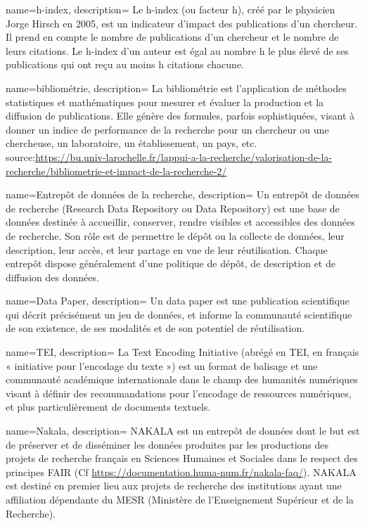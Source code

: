 {
    name=h-index,
    description={
    Le h-index (ou facteur h), créé par le physicien Jorge Hirsch en 2005, est un indicateur d’impact des publications d’un chercheur. Il prend en compte le nombre de publications d’un chercheur et le nombre de leurs citations. Le h-index d’un auteur est égal au nombre h le plus élevé de ses publications qui ont reçu au moins h citations chacune.
    }
}


{
    name=bibliométrie,
    description={
    La bibliométrie est l’application de méthodes statistiques et mathématiques pour mesurer et évaluer la production et la diffusion de publications. Elle génère des formules, parfois sophistiquées, visant à donner un indice de performance de la recherche pour un chercheur ou une chercheuse, un laboratoire, un établissement, un pays, etc.
    source:\url{https://bu.univ-larochelle.fr/lappui-a-la-recherche/valorisation-de-la-recherche/bibliometrie-et-impact-de-la-recherche-2/}
    }
}

{
    name=Entrepôt de données de la recherche,
    description={
    Un entrepôt de données de recherche (Research Data Repository ou Data Repository) est une base de données destinée à accueillir, conserver, rendre visibles et accessibles des données de recherche. Son rôle est de permettre le dépôt ou la collecte de données, leur description, leur accès, et leur partage en vue de leur réutilisation. Chaque entrepôt dispose généralement d’une politique de dépôt, de description et de diffusion des données. 
    }
}


{
    name=Data Paper,
    description={
    Un data paper est une publication scientifique qui décrit précisément un jeu de données, et informe la communauté scientifique de son existence, de ses modalités et de son potentiel de réutilisation.
    }
}

{
    name=TEI,
    description={
    La Text Encoding Initiative (abrégé en TEI, en français « initiative pour l’encodage du texte ») est un format de balisage et une communauté académique internationale dans le champ des humanités numériques visant à définir des recommandations pour l’encodage de ressources numériques, et plus particulièrement de documents textuels.
    }
}


{
    name=Nakala,
    description={
    NAKALA est un entrepôt de données dont le but est de préserver et de disséminer les données produites par les productions des projets de recherche français en Sciences Humaines et Sociales dans le respect des principes FAIR (Cf \url{https://documentation.huma-num.fr/nakala-faq/}). NAKALA est destiné en premier lieu aux projets de recherche des institutions ayant une affiliation dépendante du MESR (Ministère de l’Enseignement Supérieur et de la Recherche).
    }
}



